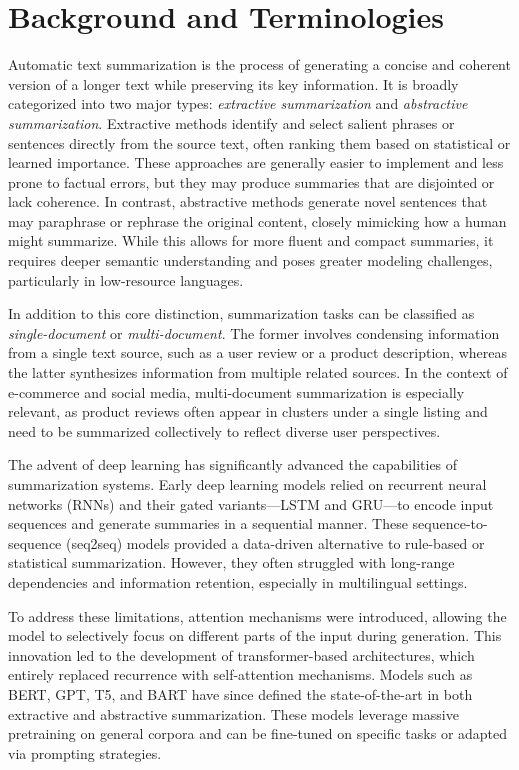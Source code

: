 \documentclass{article}
\begin{document}
\vspace{1em}
\section{Background and Terminologies}
Automatic text summarization is the process of generating a concise and coherent version of a longer text while preserving its key information. It is broadly categorized into two major types: \textit{extractive summarization} and \textit{abstractive summarization}. Extractive methods identify and select salient phrases or sentences directly from the source text, often ranking them based on statistical or learned importance. These approaches are generally easier to implement and less prone to factual errors, but they may produce summaries that are disjointed or lack coherence. In contrast, abstractive methods generate novel sentences that may paraphrase or rephrase the original content, closely mimicking how a human might summarize. While this allows for more fluent and compact summaries, it requires deeper semantic understanding and poses greater modeling challenges, particularly in low-resource languages.

In addition to this core distinction, summarization tasks can be classified as \textit{single-document} or \textit{multi-document}. The former involves condensing information from a single text source, such as a user review or a product description, whereas the latter synthesizes information from multiple related sources. In the context of e-commerce and social media, multi-document summarization is especially relevant, as product reviews often appear in clusters under a single listing and need to be summarized collectively to reflect diverse user perspectives.

The advent of deep learning has significantly advanced the capabilities of summarization systems. Early deep learning models relied on recurrent neural networks (RNNs) and their gated variants—LSTM and GRU—to encode input sequences and generate summaries in a sequential manner. These sequence-to-sequence (seq2seq) models provided a data-driven alternative to rule-based or statistical summarization. However, they often struggled with long-range dependencies and information retention, especially in multilingual settings.

To address these limitations, attention mechanisms were introduced, allowing the model to selectively focus on different parts of the input during generation. This innovation led to the development of transformer-based architectures, which entirely replaced recurrence with self-attention mechanisms. Models such as BERT, GPT, T5, and BART have since defined the state-of-the-art in both extractive and abstractive summarization. These models leverage massive pretraining on general corpora and can be fine-tuned on specific tasks or adapted via prompting strategies.
\end{document}
